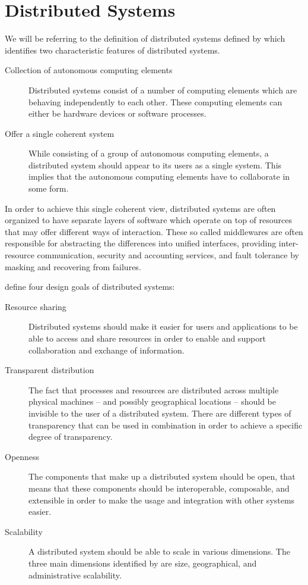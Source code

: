 \section{Distributed Systems}
\label{sec:distributed-systems}

We will be referring to the definition of distributed systems defined by
\citeauthor{tannenbaum2017} \cite{tannenbaum2017} which identifies two
characteristic features of distributed systems.

\begin{description}
  \item[Collection of autonomous computing elements]
    Distributed systems consist of a number of computing elements which are
    behaving independently to each other. These computing elements can either be
    hardware devices or software processes.
  \item[Offer a single coherent system]
    While consisting of a group of autonomous computing elements, a distributed
    system should appear to its users as a single system. This implies that the
    autonomous computing elements have to collaborate in some form.
\end{description}

In order to achieve this single coherent view, distributed systems are often
organized to have separate layers of software which operate on top of resources
that may offer different ways of interaction. These so called middlewares are
often responsible for abstracting the differences into unified interfaces,
providing inter-resource communication, security and accounting services, and
fault tolerance by masking and recovering from failures.

\citeauthor{tannenbaum2017} define four design goals of distributed systems:

\begin{description}
  \item[Resource sharing] 
    Distributed systems should make it easier for users and applications to be
    able to access and share resources in order to enable and support
    collaboration and exchange of information.
  \item[Transparent distribution] 
    The fact that processes and resources are distributed across multiple
    physical machines -- and possibly geographical locations -- should be
    invisible to the user of a distributed system. There are different types of
    transparency that can be used in combination in order to achieve a specific
    degree of transparency.
  \item[Openness]
    The components that make up a distributed system should be open, that means
    that these components should be interoperable, composable, and extensible
    in order to make the usage and integration with other systems easier.
  \item[Scalability]
    A distributed system should be able to scale in various dimensions. The
    three main dimensions identified by \citeauthor{neuman1994scale}
    \cite{neuman1994scale} are size, geographical, and administrative
    scalability.
\end{description}

